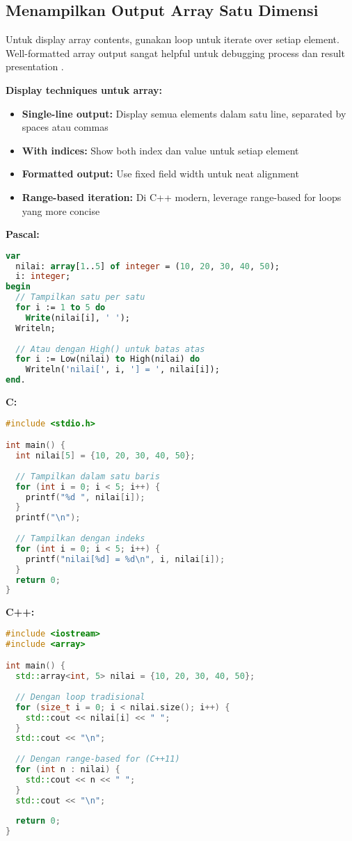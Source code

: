\documentclass[../main.tex]{subfiles}
\begin{document}
\subsection{Menampilkan Output Array Satu Dimensi}
Untuk display array contents, gunakan loop untuk iterate over setiap element. Well-formatted array output sangat helpful untuk debugging process dan result presentation \parencite{tutorialspoint-c-arrays,cplusplus-arrays,galuhratna-array-c}.

\textbf{Display techniques untuk array:}
\begin{itemize}
  \item \textbf{Single-line output:} Display semua elements dalam satu line, separated by spaces atau commas
  \item \textbf{With indices:} Show both index dan value untuk setiap element
  \item \textbf{Formatted output:} Use fixed field width untuk neat alignment
  \item \textbf{Range-based iteration:} Di C++ modern, leverage range-based for loops yang more concise
\end{itemize}

\textbf{Pascal:}
\begin{lstlisting}[language=Pascal, caption={Menampilkan array di Pascal}]
var
  nilai: array[1..5] of integer = (10, 20, 30, 40, 50);
  i: integer;
begin
  // Tampilkan satu per satu
  for i := 1 to 5 do
    Write(nilai[i], ' ');
  Writeln;
  
  // Atau dengan High() untuk batas atas
  for i := Low(nilai) to High(nilai) do
    Writeln('nilai[', i, '] = ', nilai[i]);
end.
\end{lstlisting}

\textbf{C:}
\begin{lstlisting}[language=C, caption={Menampilkan array di C}]
#include <stdio.h>

int main() {
  int nilai[5] = {10, 20, 30, 40, 50};
  
  // Tampilkan dalam satu baris
  for (int i = 0; i < 5; i++) {
    printf("%d ", nilai[i]);
  }
  printf("\n");
  
  // Tampilkan dengan indeks
  for (int i = 0; i < 5; i++) {
    printf("nilai[%d] = %d\n", i, nilai[i]);
  }
  return 0;
}
\end{lstlisting}

\textbf{C++:}
\begin{lstlisting}[language=C++, caption={Menampilkan array di C++}]
#include <iostream>
#include <array>

int main() {
  std::array<int, 5> nilai = {10, 20, 30, 40, 50};
  
  // Dengan loop tradisional
  for (size_t i = 0; i < nilai.size(); i++) {
    std::cout << nilai[i] << " ";
  }
  std::cout << "\n";
  
  // Dengan range-based for (C++11)
  for (int n : nilai) {
    std::cout << n << " ";
  }
  std::cout << "\n";
  
  return 0;
}
\end{lstlisting}
\end{document}
